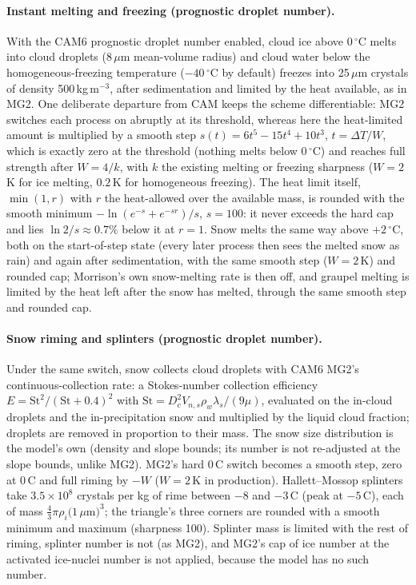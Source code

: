 \documentclass[11pt,twoside]{report}
\begin{document}
\paragraph{Instant melting and freezing (prognostic droplet number).}
With the CAM6 prognostic droplet number enabled, cloud ice above
$0\,^\circ$C melts into cloud droplets (8\,$\mu$m mean-volume radius) and cloud
water below the homogeneous-freezing temperature ($-40\,^\circ$C by default)
freezes into 25\,$\mu$m crystals of density 500\,kg\,m$^{-3}$, after
sedimentation and limited by the heat available, as in MG2.  One deliberate
departure from CAM keeps the scheme differentiable: MG2 switches each process on
abruptly at its threshold, whereas here the heat-limited amount is multiplied by
a smooth step $s(t)=6t^5-15t^4+10t^3$, $t=\Delta T/W$, which is exactly zero at
the threshold (nothing melts below $0\,^\circ$C) and reaches full strength after
$W=4/k$, with $k$ the existing melting or freezing sharpness ($W=2$\,K for ice
melting, $0.2$\,K for homogeneous freezing).  The heat limit itself,
$\min(1,r)$ with $r$ the heat-allowed over the available mass, is rounded with
the smooth minimum $-\ln(e^{-s}+e^{-sr})/s$, $s=100$: it never exceeds the hard
cap and lies $\ln 2/s\approx0.7\%$ below it at $r=1$.  Snow melts the same way above
$+2\,^\circ$C, both on the start-of-step state (every later process then sees
the melted snow as rain) and again after sedimentation, with the same smooth
step ($W=2$\,K) and rounded cap; Morrison's own snow-melting rate is then off,
and graupel melting is limited by the heat left after the snow has melted,
through the same smooth step and rounded cap.

\paragraph{Snow riming and splinters (prognostic droplet number).}
Under the same switch, snow collects cloud droplets with CAM6 MG2's
continuous-collection rate: a Stokes-number collection efficiency
$E=\mathrm{St}^2/(\mathrm{St}+0.4)^2$ with
$\mathrm{St}=D_c^2 V_{n,s}\rho_w\lambda_s/(9\mu)$, evaluated on the in-cloud
droplets and the in-precipitation snow and multiplied by the liquid cloud
fraction; droplets are removed in proportion to their mass.  The snow size
distribution is the model's own (density and slope bounds; its number is not
re-adjusted at the slope bounds, unlike MG2).  MG2's hard 0\,\textdegree C
switch becomes a smooth step, zero at 0\,\textdegree C and full riming by
$-W$ ($W=2$\,K in production).  Hallett--Mossop splinters take
$3.5\times10^{8}$ crystals per kg of rime between $-8$ and $-3$\,\textdegree C
(peak at $-5$\,\textdegree C), each of mass $\frac{4}{3}\pi\rho_i(1\,\mu$m$)^3$;
the triangle's three corners are rounded with a smooth minimum and maximum
(sharpness 100).  Splinter mass is limited with the rest of riming, splinter
number is not (as MG2), and MG2's cap of ice number at the activated ice-nuclei
number is not applied, because the model has no such number.
\end{document}
